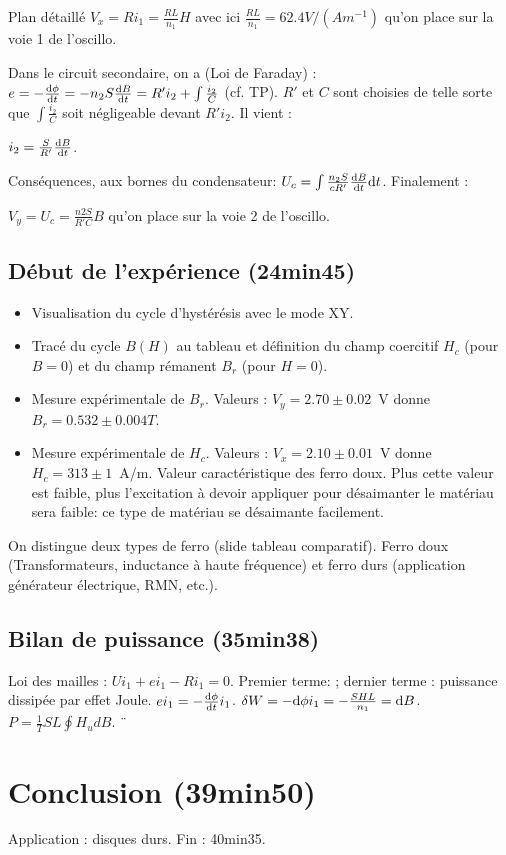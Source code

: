\begin{reportBlock}{Plan détaillé}
$V_x = R i_1 = \frac{R L}{n_1} H$ avec ici $\frac{R L}{n_1} = 62.4 V/(Am^{-1})$ qu'on place sur la voie 1 de l'oscillo.

Dans le circuit secondaire, on a (Loi de Faraday) : $e = -\frac{\mathrm{d} \phi}{\mathrm{d} t} = -n_2 S \frac{\mathrm{d} B}{\mathrm{d} t} = R' i_2 + \int \frac{i_2}{C}$ (cf. TP). $R'$ et $C$ sont choisies de telle sorte que $\int \frac{i_2}{C}$ soit négligeable devant $R' i_2$. Il vient :

$i_2 = \frac{S}{R'} \frac{\mathrm{d} B}{\mathrm{d} t}$.

Conséquences, aux bornes du condensateur: $U_c = \int \frac{n_2 S}{c R'} \frac{\mathrm{d} B}{\mathrm{d} t} \mathrm{d} t$. Finalement :

$V_y = U_c = \frac{n2 S}{R' C} B$ qu'on place sur la voie 2 de l'oscillo.

\subsection*{Début de l'expérience (24min45)}

\begin{itemize}
    \item Visualisation du cycle d'hystérésis avec le mode XY.
    \item Tracé du cycle $B(H)$ au tableau et définition du champ coercitif $H_c$ (pour $B=0$) et du champ rémanent $B_r$ (pour $H=0$).
    \item Mesure expérimentale de $B_r$. Valeurs : $V_y = 2.70 \pm 0.02$~V donne $B_r = 0.532 \pm 0.004 T$. 
    \item Mesure expérimentale de $H_c$. Valeurs : $V_x = 2.10 \pm 0.01$~V donne $H_c = 313 \pm 1$~A/m. Valeur caractéristique des ferro doux. Plus cette valeur est faible, plus l'excitation à devoir appliquer pour désaimanter le matériau sera faible: ce type de matériau se désaimante facilement.  
\end{itemize}

On distingue deux types de ferro (slide tableau comparatif). Ferro doux (Transformateurs, inductance à haute fréquence) et ferro durs (application générateur électrique, RMN, etc.).

\subsection{Bilan de puissance (35min38)}

Loi des mailles : $U i_1 + e i_1 - R i_1 = 0$. Premier terme: ; dernier terme : puissance dissipée par effet Joule. $e i_1 = - \frac{\mathrm{d} \phi}{\mathrm{d} t} i_1$. $\delta W = - \mathrm{d} \phi i_1 = - \frac{SHL}{n_1} = \mathrm{d} B$. $P = \frac{1}{T} SL \oint H _ud B$. ¨

\section*{Conclusion (39min50)}

Application : disques durs.
Fin : 40min35.

\end{reportBlock}


